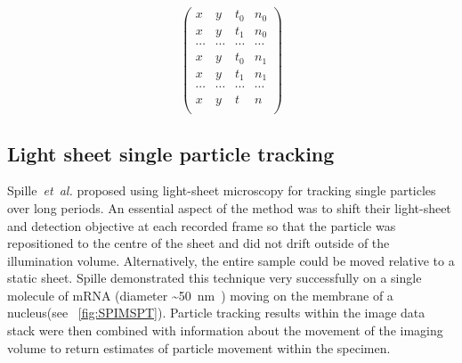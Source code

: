 \begin{figure}
\begin{subfigure}[t]{0.45\linewidth}
\begin{equation}
                \begin{pmatrix}
              x & y & t_0 & n_0\\
              x & y & t_1 & n_0 \\
              \cdots & \cdots & \cdots & \cdots \\
              x & y & t_0 & n_1 \\
              x & y & t_1 & n_1 \\
              \cdots & \cdots & \cdots & \cdots \\
              x & y & t & n \\
          \end{pmatrix}\label{eq:xytn_detection}
        \end{equation}
    \end{subfigure}
\end{figure}

\subsection{Light sheet single particle tracking}

Spille~\emph{et~al.} proposed using \gls{light-sheet} microscopy for tracking single particles over long periods.
An essential aspect of the method was to shift their \gls{light-sheet}
and detection objective at each recorded frame so that the particle was repositioned to the centre of the sheet and did not drift outside of the illumination volume.
Alternatively, the entire sample could be moved relative to a static sheet.
Spille demonstrated this technique very successfully on a single molecule of mRNA (diameter \SI{~50}{\nano\metre}~\cite{spille_direct_2015}) moving on the membrane of a nucleus(see \figurename~\ref{fig:SPIMSPT}).
Particle tracking results within the image data stack were then combined with information about the movement of the imaging volume to return estimates of particle movement within the specimen.

